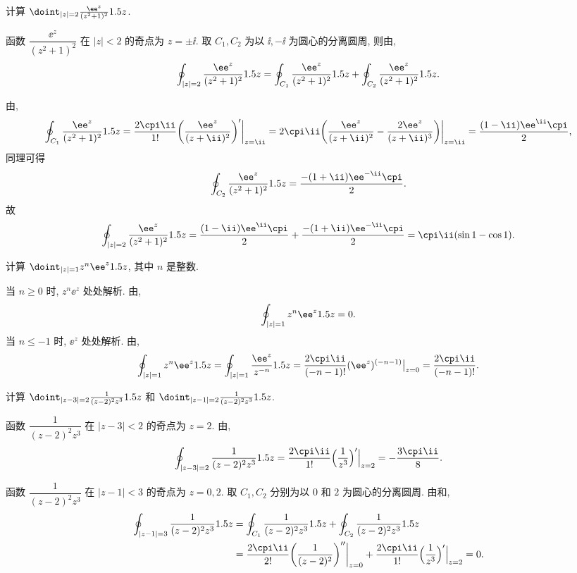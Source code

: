 \begin{example}
  计算 $\doint_{|z|=2}\frac{\ee^z}{(z^2+1)^2}\d z$.
\end{example}

\begin{solution}
  函数 $\dfrac{\ee^z}{(z^2+1)^2}$ 在 $|z|<2$ 的奇点为 $z=\pm\ii $.
  取 $C_1,C_2$ 为以 $\ii,-\ii $ 为圆心的分离圆周, 则由\thmCCC,
  \[
     \oint_{|z|=2}\frac{\ee^z}{(z^2+1)^2}\d z
    =\oint_{C_1}\frac{\ee^z}{(z^2+1)^2}\d z
    +\oint_{C_2}\frac{\ee^z}{(z^2+1)^2}\d z.
  \]

  由\thmCIH,
  \[
     \oint_{C_1}\frac{\ee^z}{(z^2+1)^2}\d z
    =\frac{2\cpi\ii}{1!}\biggl(\frac{\ee^z}{(z+\ii)^2}\biggr)'\bigg|_{z=\ii }
    =2\cpi\ii \biggl(\frac{\ee^z}{(z+\ii)^2}-\frac{2\ee^z}{(z+\ii)^3}\biggr)\bigg|_{z=\ii }
    =\frac{(1-\ii)\ee^\ii \cpi}2,
  \]
  同理可得
  \[
     \oint_{C_2}\frac{\ee^z}{(z^2+1)^2}\d z
    =\frac{-(1+\ii)\ee^{-\ii }\cpi}2.
  \]
  故
  \[
     \oint_{|z|=2}\frac{\ee^z}{(z^2+1)^2}\d z
    =\frac{(1-\ii)\ee^\ii \cpi}2+\frac{-(1+\ii)\ee^{-\ii }\cpi}2
    =\cpi\ii (\sin1-\cos1).
  \]
\end{solution}

\begin{example}
  计算 $\doint_{|z|=1}z^n\ee^z\d z$, 其中 $n$ 是整数.
\end{example}

\begin{solution}
  当 $n\ge 0$ 时, $z^n\ee^z$ 处处解析.
  由\thmCG, 
  \[
    \oint_{|z|=1}z^n\ee^z\d z=0.
  \]
  当 $n\le-1$ 时, $\ee^z$ 处处解析.
  由\thmCIH,
  \[
     \oint_{|z|=1}z^n\ee^z\d z
    =\oint_{|z|=1}\frac{\ee^z}{z^{-n}}\d z
    =\frac{2\cpi\ii}{(-n-1)!}(\ee^z)^{(-n-1)}\big|_{z=0}
    =\frac{2\cpi\ii}{(-n-1)!}.
  \]
\end{solution}

\begin{example}
  计算 $\doint_{|z-3|=2}\frac1{(z-2)^2z^3}\d z$ 和 $\doint_{|z-1|=2}\frac1{(z-2)^2z^3}\d z$.
\end{example}

\begin{solutionenum}
  \item 函数 $\dfrac1{(z-2)^2z^3}$ 在 $|z-3|<2$ 的奇点为 $z=2$.
  由\thmCIH,
  \[
      \oint_{|z-3|=2}\frac1{(z-2)^2z^3}\d z
    =\frac{2\cpi\ii}{1!}\Bigl(\frac1{z^3}\Bigr)'\Big|_{z=2}
    =-\frac{3\cpi\ii }8.
  \]
  \item \label{enum:exam-contain-all-singular}
  函数 $\dfrac1{(z-2)^2z^3}$ 在 $|z-1|<3$ 的奇点为 $z=0,2$.
  取 $C_1,C_2$ 分别为以 $0$ 和 $2$ 为圆心的分离圆周.
  由\thmCCC 和\thmCI,
  \begin{align*}
      \oint_{|z-1|=3}\frac1{(z-2)^2z^3}\d z
    &=\oint_{C_1}\frac1{(z-2)^2z^3}\d z+\oint_{C_2}\frac1{(z-2)^2z^3}\d z\\
    &=\frac{2\cpi\ii}{2!}\biggl(\frac1{(z-2)^2}\biggr)''\bigg|_{z=0}+\frac{2\cpi\ii}{1!}\Bigl(\frac1{z^3}\Bigr)'\Big|_{z=2}=0.
  \end{align*}
\end{solutionenum}

